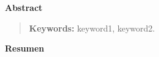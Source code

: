 \vspace*{2cm}
\pagestyle{empty}
{\bfseries \Huge Abstract }
\vspace{1.5cm}

\begin{quotation}






{\bf Keywords:} keyword1, keyword2.
\end{quotation}


\newpage

\vspace*{2cm}
\pagestyle{empty}
{\bfseries \Huge Resumen }
\vspace{1.5cm}

